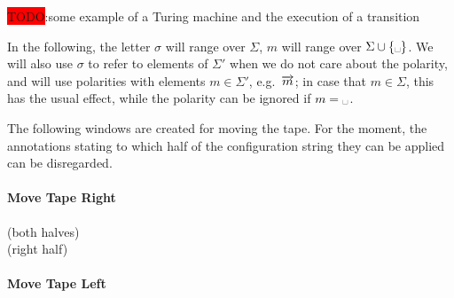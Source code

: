 \documentclass[a4paper,UKenglish,cleveref, autoref]{lipics-v2019}
\newcommand{\TODO}[1]{\colorbox{red}{\LARGE TODO}:#1}
\begin{document}
\begin{example}
  \TODO{some example of a Turing machine and the execution of a transition}
\end{example}


In the following, the letter $\sigma$ will range over $\Sigma$, $m$ will range over $\Sigma \cup \{\blank\}$. 
We will also use $\sigma$ to refer to elements of $\Sigma'$ when we do not care about the polarity, and will use polarities with elements $m \in \Sigma'$, e.g.\ $\overrightarrow{m}$; in case that $m \in \Sigma$, this has the usual effect, while the polarity can be ignored if $m = \blank$. 


The following windows are created for moving the tape. For the moment, the annotations stating to which half of the configuration string they can be applied can be disregarded.
\paragraph*{Move Tape Right}
\begin{center}
  \quad (both halves)
  \\[3ex]
  \quad (right half)
\end{center}

\paragraph*{Move Tape Left}
\begin{center}
   \\[3ex]
   \\[3ex]
\end{center}
\end{document}
